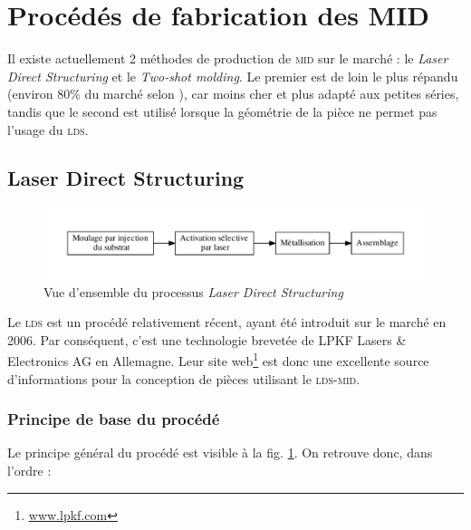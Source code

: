\section{Procédés de fabrication des MID}
Il existe actuellement 2 méthodes de production de \textsc{mid} sur le marché :
le \emph{Laser Direct Structuring} et le \emph{Two-shot molding}. Le premier est
de loin le plus répandu (environ 80\% du marché selon \cite{mid-2011}), car moins
cher et plus adapté aux petites séries, tandis que le second est utilisé lorsque
la géométrie de la pièce ne permet pas l'usage du \textsc{lds}.

\subsection{Laser Direct Structuring}
\begin{figure}[h]
    \begin{center}
        \includegraphics[width=\textwidth]{images/lds_process}
        \caption{Vue d'ensemble du processus \emph{Laser Direct Structuring}}\label{fig:lds-process}
    \end{center}
\end{figure}
Le \textsc{lds} est un procédé relativement récent, ayant été introduit sur le
marché en 2006. Par conséquent, c'est une technologie brevetée de LPKF Lasers \&
Electronics AG en Allemagne. Leur site web\footnote{\url{www.lpkf.com}} est donc
une excellente source d'informations pour la conception de pièces utilisant
le \textsc{lds-mid}.

\subsubsection{Principe de base du procédé}
Le principe général du procédé est visible à la fig. \ref{fig:lds-process}. On
retrouve donc, dans l'ordre :

